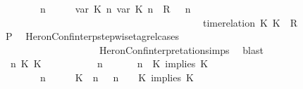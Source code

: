 \begin{isabellebody}
\ \ \ \ \ \ \ {\isacartoucheopen}{\isacharparenleft}{\isasymGamma}\ n\ {\isasymturnstile}\ {\isasymPsi}\ {\isasymtriangleright}\ {\isasymPhi}\ {\isacharequal}\ {\isacharparenleft}{\isacharparenleft}{\isacharparenleft}{\isasymlfloor}{\isasymtau}\isactrlsub v\isactrlsub a\isactrlsub r\ {\isacharparenleft}K\ n{\isacharparenright}{\isacharcomma}\ {\isasymtau}\isactrlsub v\isactrlsub a\isactrlsub r\ {\isacharparenleft}K\ n{\isacharparenright}{\isasymrfloor}\ {\isasymin}\ R{\isacharparenright}\ {\isacharhash}\ {\isasymGamma}{\isacharparenright}{\isacharcomma}\ n\isanewline
\ \ \ \ \ \ \ \ \ \ \ \ \ \ \ \ \ \ \ \ \ \ \ \ \ \ \ \ \ \ \ \ \ \ \ \ \ \ {\isasymturnstile}\ {\isasymPsi}\ {\isasymtriangleright}\ {\isacharparenleft}{\isacharparenleft}time{\isacharminus}relation\ {\isasymlfloor}K\ K\ {\isasymin}\ R{\isacharparenright}\ {\isacharhash}\ {\isasymPhi}{\isacharparenright}{\isacharparenright}{\isacartoucheclose}\isanewline
\ \ \ \ \ \ \isamarkupfalse%
\ {\isacharquery}P\ \isamarkupfalse%
\ HeronConf{\isacharunderscore}interp{\isacharunderscore}stepwise{\isacharunderscore}tagrel{\isacharunderscore}cases\isanewline
\ \ \ \ \ \ \ \ \ \ \ \ \ \ \ \ \ \ \ \ HeronConf{\isacharunderscore}interpretation{\isachardot}simps\ \isamarkupfalse%
\ blast\isanewline
\ \ \ \ \isamarkupfalse%
\isanewline
\ \ \ \ \ \ \isamarkupfalse%
\ {\isasymGamma}\ n\ K\ K\ {\isasymPsi}\ {\isasymPhi}\isanewline
\ \ \ \ \ \ \isamarkupfalse%
\ {\isacartoucheopen}{\isacharparenleft}{\isasymGamma}\ n\ {\isasymturnstile}\ {\isasymPsi}\ {\isasymtriangleright}\ {\isasymPhi}\ {\isacharequal}\ {\isacharparenleft}{\isasymGamma}{\isacharcomma}\ n\ {\isasymturnstile}\ {\isacharparenleft}K\ implies\ K\ {\isacharhash}\ {\isasymPsi}\ {\isasymtriangleright}\ {\isasymPhi}{\isacharparenright}{\isacartoucheclose}\isanewline
\ \ \ \ \ \ \ {\isacartoucheopen}{\isacharparenleft}{\isasymGamma}\ n\ {\isasymturnstile}\ {\isasymPsi}\ {\isasymtriangleright}\ {\isasymPhi}\ {\isacharequal}\ {\isacharparenleft}{\isacharparenleft}{\isacharparenleft}K\ {\isasymnot}{\isasymUp}\ n{\isacharparenright}\ {\isacharhash}\ {\isasymGamma}{\isacharparenright}{\isacharcomma}\ n\ {\isasymturnstile}\ {\isasymPsi}\ {\isasymtriangleright}\ {\isacharparenleft}{\isacharparenleft}K\ implies\ K\ {\isacharhash}\ {\isasymPhi}{\isacharparenright}{\isacharparenright}{\isacartoucheclose}\isanewline

\end{isabellebody}

